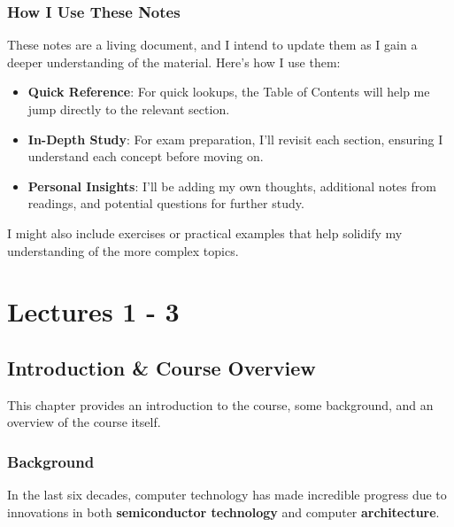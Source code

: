 \documentclass[
  12pt,
  a4paper,
]{report}
\providecommand{\tightlist}{%
  \setlength{\itemsep}{0pt}\setlength{\parskip}{0pt}}\usepackage{longtable,booktabs,array}
\begin{document}
\section*{How I Use These Notes}\label{how-i-use-these-notes}


These notes are a living document, and I intend to update them as I gain
a deeper understanding of the material. Here's how I use them:

\begin{itemize}
\tightlist
\item
  \textbf{Quick Reference}: For quick lookups, the Table of Contents
  will help me jump directly to the relevant section.
\item
  \textbf{In-Depth Study}: For exam preparation, I'll revisit each
  section, ensuring I understand each concept before moving on.
\item
  \textbf{Personal Insights}: I'll be adding my own thoughts, additional
  notes from readings, and potential questions for further study.
\end{itemize}

I might also include exercises or practical examples that help solidify
my understanding of the more complex topics.

\part{Lectures 1 - 3}

\chapter{Introduction \& Course
Overview}\label{introduction-course-overview}

\label{01Introduction}
This chapter provides an introduction to the course, some background,
and an overview of the course itself.

\label{CourseBackground}
\section{Background}\label{background}

\label{BackgroundIntro}
In the last six decades, computer technology has made incredible
progress due to innovations in both \textbf{semiconductor technology}
and computer \textbf{architecture}.
\end{document}
